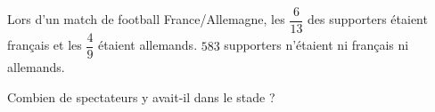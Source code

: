 \begin{exercice*}[Foot]
    Lors d'un match de football France/Allemagne, les $\dfrac{6}{13}$ des supporters
    étaient français et les $\dfrac{4}{9}$ étaient allemands. $583$ supporters n'étaient ni
    français ni allemands.
    
    Combien de spectateurs y avait-il dans le stade ?
\end{exercice*}
 

